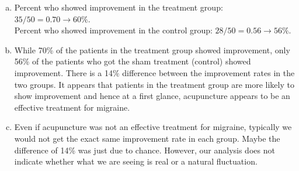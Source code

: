 {{}
{
\begin{enumerate}[(a)]
\item Percent who showed improvement in the treatment group: $35/50 = 0.70 \rightarrow 60\%$. \\
Percent who showed improvement in the control group: $28/50 = 0.56 \rightarrow 56\%$. \\
\item While 70\% of the patients in the treatment group showed improvement, only 56\% of the patients who got the sham treatment (control) showed improvement. There is a 14\% difference between the improvement rates in the two groups. It appears that patients in the treatment group are more likely to show improvement and hence at a first glance, acupuncture appears to be an effective treatment for migraine.
\item Even if acupuncture was not an effective treatment for migraine, typically we would not get the exact same improvement rate in each group. Maybe the difference of 14\% was just due to chance. However, our analysis does not indicate whether what we are seeing is real or a natural fluctuation. 
\end{enumerate}
}}

%

